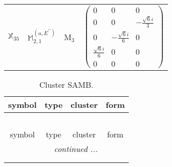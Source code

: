 \documentclass[fleqn,10pt,landscape]{article}
\begin{document}
\begin{itemize}
\begin{center}
\begin{longtable}{c|c|c|c}
$ \mathbb{X}_{35} $ & $\mathbb{M}_{2,1}^{(a,E^{\prime\prime})}$ & M$_{3}$ & $\begin{pmatrix} 0 & 0 & 0 \\ 0 & 0 & - \frac{\sqrt{6} i}{3} \\ 0 & - \frac{\sqrt{6} i}{6} & 0 \\ \frac{\sqrt{6} i}{6} & 0 & 0 \\ 0 & 0 & 0 \end{pmatrix}$ \\
\end{longtable}
\end{center}
\begin{center}
\renewcommand{\arraystretch}{1.3}
\begin{longtable}{c|c|c|c}
\caption{Cluster SAMB.}
 \\
 \hline \hline
symbol & type & cluster & form \\ \hline \endfirsthead

\multicolumn{3}{l}{\tablename\ \thetable{}} \\
 \hline \hline
symbol & type & cluster & form \\ \hline \endhead

 \hline \hline
\multicolumn{3}{r}{\footnotesize\it continued ...} \\ \endfoot

 \hline \hline
\multicolumn{3}{r}{} \\ \endlastfoot


\end{longtable}
\end{center}
\end{itemize}
\end{document}
